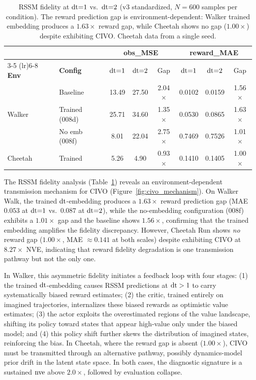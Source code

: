 \begin{table}[h]
\centering
\caption{RSSM fidelity at $\mathrm{dt}{=}1$ vs.\ $\mathrm{dt}{=}2$ (v3 standardized, $N{=}600$ samples per condition). The reward prediction gap is environment-dependent: Walker trained embedding produces a $1.63\times$ reward gap, while Cheetah shows no gap ($1.00\times$) despite exhibiting CIVO. Cheetah data from a single seed.}
\label{tab:rssm_fidelity}
\footnotesize
\setlength{\tabcolsep}{4pt}
\begin{tabular}{llcccccc}
\toprule
& & \multicolumn{3}{c}{\textbf{obs\_MSE}} & \multicolumn{3}{c}{\textbf{reward\_MAE}} \\
\cmidrule(lr){3-5} \cmidrule(lr){6-8}
\textbf{Env} & \textbf{Config} & $\mathrm{dt}{=}1$ & $\mathrm{dt}{=}2$ & Gap & $\mathrm{dt}{=}1$ & $\mathrm{dt}{=}2$ & Gap \\
\midrule
\multirow{3}{*}{Walker} & Baseline & 13.49 & 27.50 & 2.04$\times$ & 0.0102 & 0.0159 & 1.56$\times$ \\
& Trained (008d) & 25.71 & 34.60 & 1.35$\times$ & 0.0530 & 0.0865 & 1.63$\times$ \\
& No emb (008f) & 8.01 & 22.04 & 2.75$\times$ & 0.7469 & 0.7526 & 1.01$\times$ \\
\midrule
Cheetah & Trained & 5.26 & 4.90 & 0.93$\times$ & 0.1410 & 0.1405 & 1.00$\times$ \\
\bottomrule
\end{tabular}
\end{table}

The RSSM fidelity analysis (Table~\ref{tab:rssm_fidelity}) reveals an environment-dependent transmission mechanism for CIVO (Figure~\ref{fig:civo_mechanism}).  On Walker Walk, the trained $\mathrm{dt}$-embedding produces a $1.63\times$ reward prediction gap (MAE $0.053$ at $\mathrm{dt}{=}1$ vs.\ $0.087$ at $\mathrm{dt}{=}2$), while the no-embedding configuration (008f) exhibits a $1.01\times$ gap and the baseline shows $1.56\times$, confirming that the trained embedding amplifies the fidelity discrepancy.  However, Cheetah Run shows \emph{no} reward gap ($1.00\times$, MAE ${\approx}0.141$ at both scales) despite exhibiting CIVO at $8.27\times$ NVE, indicating that reward fidelity degradation is one transmission pathway but not the only one.

In Walker, this asymmetric fidelity initiates a feedback loop with four stages: (1) the trained $\mathrm{dt}$-embedding causes RSSM predictions at $\mathrm{dt} > 1$ to carry systematically biased reward estimates; (2) the critic, trained entirely on imagined trajectories, internalizes these biased rewards as optimistic value estimates; (3) the actor exploits the overestimated regions of the value landscape, shifting its policy toward states that appear high-value only under the biased model; and (4) this policy shift further skews the distribution of imagined states, reinforcing the bias.  In Cheetah, where the reward gap is absent ($1.00\times$), CIVO must be transmitted through an alternative pathway, possibly dynamics-model prior drift in the latent state space.  In both cases, the diagnostic signature is a sustained $\mathrm{nve}$ above $2.0\times$, followed by evaluation collapse.

